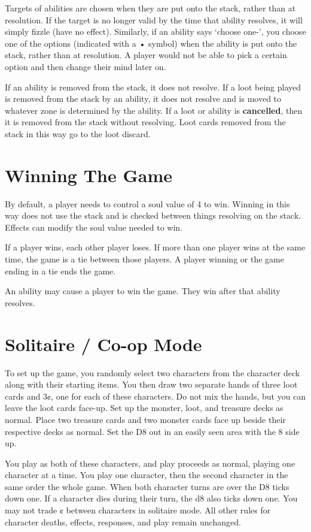 \documentclass[10pt, a4paper, twoside]{article} %
\begin{document}
    Targets of abilities are chosen when they are put onto the stack, rather than at resolution. If the target is no longer valid by the time that ability resolves, it will simply fizzle (have no effect). Similarly, if an ability says ‘choose one-’, you choose one of the options (indicated with a • symbol) when the ability is put onto the stack, rather than at resolution. A player would not be able to pick a certain option and then change their mind later on.

    If an ability is removed from the stack, it does not resolve. If a loot being played is removed from the stack by an ability, it does not resolve and is moved to whatever zone is determined by the ability. If a loot or ability is \textbf{cancelled}, then it is removed from the stack without resolving. Loot cards removed from the stack in this way go to the loot discard.

    \section{Winning The Game}
    \label{winning}
    By default, a player needs to control a soul value of 4 to win. Winning in this way does not use the stack and is checked between things resolving on the stack. Effects can modify the soul value needed to win.

    If a player wins, each other player loses. If more than one player wins at the same time, the game is a tie between those players. A player winning or the game ending in a tie ends the game.

    An ability may cause a player to win the game. They win after that ability resolves.

    \section{Solitaire / Co-op Mode}
    \label{solitaire}
    To set up the game, you randomly select two characters from the character deck along with their starting items. You then draw two separate hands of three loot cards and 3¢, one for each of these characters. Do not mix the hands, but you can leave the loot cards face-up. Set up the monster, loot, and treasure decks as normal. Place two treasure cards and two monster cards face up beside their respective decks as normal. Set the D8 out in an easily seen area with the 8 side up.

    You play as both of these characters, and play proceeds as normal, playing one character at a time. You play one character, then the second character in the same order the whole game. When both character turns are over the D8 ticks down one. If a character dies during their turn, the d8 also ticks down one. You may not trade ¢ between characters in solitaire mode. All other rules for character deaths, effects, responses, and play remain unchanged.
\end{document}
